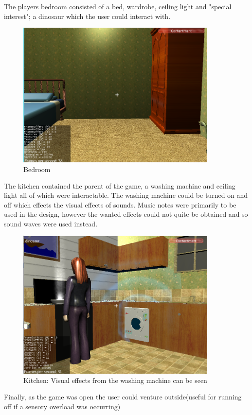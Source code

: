 \documentclass[11pt]{report}
\begin{document}
The players bedroom consisted of a bed, wardrobe, ceiling light and "special interest"; a dinosaur which the user could interact with.

\begin{figure}[H]
\centering
\includegraphics[width=100mm]{images/prototype/bedroom.png}
\caption{Bedroom}
\label{prototype_bedroom}
\end{figure}

The kitchen contained the parent of the game, a washing machine and ceiling light all of which were interactable. The washing machine could be turned on and off which effects the visual effects of sounds. Music notes were primarily to be used in the design, however the wanted effects could not quite be obtained and so sound waves were used instead.  

\begin{figure}[H]
\centering
\includegraphics[width=100mm]{images/prototype/kitchen_washingm.png}
\caption{Kitchen: Visual effects from the washing machine can be seen}
\label{prototype_kitchenwash}
\end{figure}

Finally, as the game was open the user could venture outside(useful for running off if a sensory overload was occurring)
\end{document}
